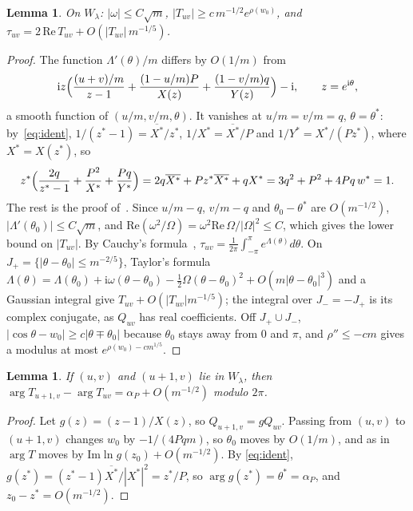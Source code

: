 \documentclass[11pt]{amsart}
\newtheorem{lemma}[theorem]{Lemma}
\theoremstyle{remark}
\newcommand{\ii}{\mathrm{i}}
\begin{document}
\begin{lemma}\label{lem:laplace}
On $W_\lambda$: $|\omega|\le C\sqrt m$, $|T_{uv}|\ge c\,m^{-1/2}e^{\rho(w_0)}$, and
$\tau_{uv}=2\,\mathrm{Re}\,T_{uv}+O(|T_{uv}|\,m^{-1/5})$.
\end{lemma}

\begin{proof}
The function $\Lambda'(\theta)/m$ differs by $O(1/m)$ from
\[
\ii z\Bigl(\frac{(u+v)/m}{z-1}+\frac{(1-u/m)P}{X(z)}+\frac{(1-v/m)q}{Y(z)}\Bigr)-\ii,\qquad z=e^{\ii\theta},
\]
a smooth function of $(u/m,v/m,\theta)$. It vanishes at $u/m=v/m=q$, $\theta=\theta^*$: by~\eqref{eq:ident},
$1/(z^*-1)=\overline{X^*}/z^*$, $1/X^*=\overline{X^*}/P$ and $1/Y^*=X^*/(Pz^*)$, where $X^*=X(z^*)$, so
\[
z^*\Bigl(\frac{2q}{z^*-1}+\frac{P^2}{X^*}+\frac{Pq}{Y^*}\Bigr)=2q\overline{X^*}+Pz^*\overline{X^*}+qX^*
=3q^2+P^2+4Pq\,w^*=1 .
\]
The rest is the proof of~\cite[Lemma~5]{Shm9}. Since $u/m-q$, $v/m-q$ and $\theta_0-\theta^*$ are $O(m^{-1/2})$,
$|\Lambda'(\theta_0)|\le C\sqrt m$, and $\mathrm{Re}(\omega^2/\Omega)=\omega^2\mathrm{Re}\,\Omega/|\Omega|^2\le C$, which gives the lower bound
on $|T_{uv}|$. By Cauchy's formula~\cite[Chapter~VIII]{FS09}, $\tau_{uv}=\frac1{2\pi}\int_{-\pi}^\pi e^{\Lambda(\theta)}d\theta$.
On $J_+=\{|\theta-\theta_0|\le m^{-2/5}\}$, Taylor's formula $\Lambda(\theta)=\Lambda(\theta_0)+\ii\omega(\theta-\theta_0)-\frac12\Omega(\theta-\theta_0)^2+O(m|\theta-\theta_0|^3)$
and a Gaussian integral give $T_{uv}+O(|T_{uv}|m^{-1/5})$; the integral over $J_-=-J_+$ is its complex conjugate,
as $Q_{uv}$ has real coefficients. Off $J_+\cup J_-$, $|\cos\theta-w_0|\ge c|\theta\mp\theta_0|$ because $\theta_0$
stays away from $0$ and $\pi$, and $\rho''\le-cm$ gives a modulus at most $e^{\rho(w_0)-cm^{1/5}}$.
\end{proof}

\begin{lemma}\label{lem:phase}
If $(u,v)$ and $(u+1,v)$ lie in $W_\lambda$, then $\arg T_{u+1,v}-\arg T_{uv}=\alpha_P+O(m^{-1/2})$ modulo $2\pi$.
\end{lemma}

\begin{proof}
Let $g(z)=(z-1)/X(z)$, so $Q_{u+1,v}=gQ_{uv}$. Passing from $(u,v)$ to $(u+1,v)$ changes $w_0$ by $-1/(4Pqm)$, so
$\theta_0$ moves by $O(1/m)$, and as in~\cite[Lemma~6]{Shm9} $\arg T$ moves by $\mathrm{Im}\ln g(z_0)+O(m^{-1/2})$. By
\eqref{eq:ident}, $g(z^*)=(z^*-1)\overline{X^*}/|X^*|^2=z^*/P$, so $\arg g(z^*)=\theta^*=\alpha_P$, and
$z_0-z^*=O(m^{-1/2})$.
\end{proof}
\end{document}
